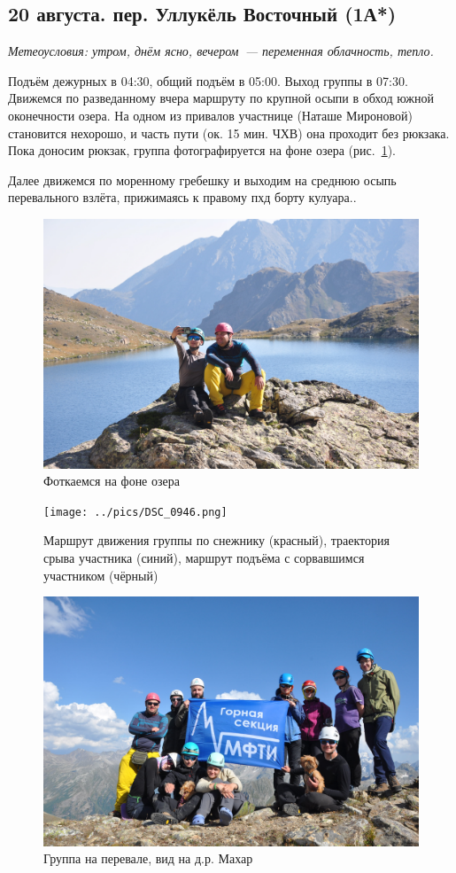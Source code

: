 \subsection{20 августа. пер. Уллукёль Восточный (1А*)}
\textit{Метеоусловия: утром, днём ясно, вечером~--- переменная облачность, тепло.}

Подъём дежурных в 04:30, общий подъём в 05:00. Выход группы в 07:30. Движемся по разведанному вчера маршруту по крупной осыпи в обход южной оконечности озера. На одном из привалов участнице (Наташе Мироновой) становится нехорошо, и часть пути (ок. 15 мин. ЧХВ) она проходит без рюкзака. Пока доносим рюкзак, группа фотографируется на фоне озера (рис.~\ref{fig:DSC_0907}).

Далее движемся по моренному гребешку и выходим на среднюю осыпь перевального взлёта, прижимаясь к правому пхд борту кулуара..

\begin{figure}[h!]
	\centering
	\includegraphics[width=0.7\linewidth]{../pics/DSC_0907}
	\caption{Фоткаемся на фоне озера}
	\label{fig:DSC_0907}
\end{figure}

\begin{figure}[h!]
	\centering
	\texttt{[image: ../pics/DSC\_0946.png]}
	\caption{Маршрут движения группы по снежнику (красный), траектория срыва участника (синий), маршрут подъёма с сорвавшимся участником (чёрный)}
	\label{fig:DSC_0946}
\end{figure}


\begin{figure}[h!]
	\centering
	\includegraphics[width=0.7\linewidth]{../pics/DSC_0982}
	\caption{Группа на перевале, вид на д.р. Махар}
	\label{fig:DSC_0982}
\end{figure}

